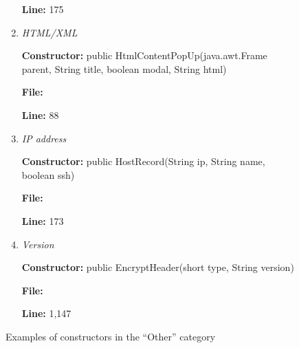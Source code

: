 \begin{figure}
\begin{enumerate}
\textbf{Line:} 175

\vspace{6px}


\item \textit{HTML/XML}

\textbf{Constructor:} public HtmlContentPopUp(java.awt.Frame parent, String title, boolean modal, String html)

\textbf{File:} 

\textbf{Line:} 88

\vspace{6px}

%
%
%


\item \textit{IP address}

%
%
%

\textbf{Constructor:} public HostRecord(String ip, String name, boolean ssh)

\textbf{File:} 

\textbf{Line:} 173

\vspace{6px}


\item \textit{Version}

%
%
%

\textbf{Constructor:} public EncryptHeader(short type, String version)

\textbf{File:} 

\textbf{Line:} 1,147

\end{enumerate}

\vspace{-12px}

\caption{Examples of constructors in the ``Other'' category}
\label{other}
\end{figure}

